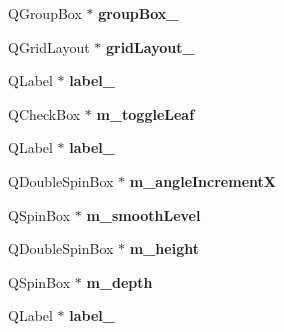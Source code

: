 \begin{DoxyCompactItemize}
\item 
\hypertarget{classUi__MainWindow_af87dc4910dc4b3434047edbb31527969}{
QGroupBox $\ast$ {\bfseries groupBox\_}}
\label{classUi__MainWindow_af87dc4910dc4b3434047edbb31527969}

\item 
\hypertarget{classUi__MainWindow_ad113cf7b76aaf178473555bdf64ff035}{
QGridLayout $\ast$ {\bfseries gridLayout\_}}
\label{classUi__MainWindow_ad113cf7b76aaf178473555bdf64ff035}

\item 
\hypertarget{classUi__MainWindow_a9dc4dba26b83e0c94aa566e1c564420b}{
QLabel $\ast$ {\bfseries label\_}}
\label{classUi__MainWindow_a9dc4dba26b83e0c94aa566e1c564420b}

\item 
\hypertarget{classUi__MainWindow_afcdd2298893643ab8eb9db4e9f07f131}{
QCheckBox $\ast$ {\bfseries m\_\-toggleLeaf}}
\label{classUi__MainWindow_afcdd2298893643ab8eb9db4e9f07f131}

\item 
\hypertarget{classUi__MainWindow_af183bfbfb9f38bbdd60caf92b15e23dc}{
QLabel $\ast$ {\bfseries label\_}}
\label{classUi__MainWindow_af183bfbfb9f38bbdd60caf92b15e23dc}

\item 
\hypertarget{classUi__MainWindow_aa44b0770557493c25421225e79543289}{
QDoubleSpinBox $\ast$ {\bfseries m\_\-angleIncrementX}}
\label{classUi__MainWindow_aa44b0770557493c25421225e79543289}

\item 
\hypertarget{classUi__MainWindow_ab11d50fd0fe395103a65244b1c24d356}{
QSpinBox $\ast$ {\bfseries m\_\-smoothLevel}}
\label{classUi__MainWindow_ab11d50fd0fe395103a65244b1c24d356}

\item 
\hypertarget{classUi__MainWindow_a33be5d8f15d7a70a60a3af5f29564653}{
QDoubleSpinBox $\ast$ {\bfseries m\_\-height}}
\label{classUi__MainWindow_a33be5d8f15d7a70a60a3af5f29564653}

\item 
\hypertarget{classUi__MainWindow_a95e45fa3f682702cecf4f8963c8853e3}{
QSpinBox $\ast$ {\bfseries m\_\-depth}}
\label{classUi__MainWindow_a95e45fa3f682702cecf4f8963c8853e3}

\item 
\hypertarget{classUi__MainWindow_a78c7e10730b43c6700cd7216911ed76a}{
QLabel $\ast$ {\bfseries label\_}}
\label{classUi__MainWindow_a78c7e10730b43c6700cd7216911ed76a}


\end{DoxyCompactItemize}
